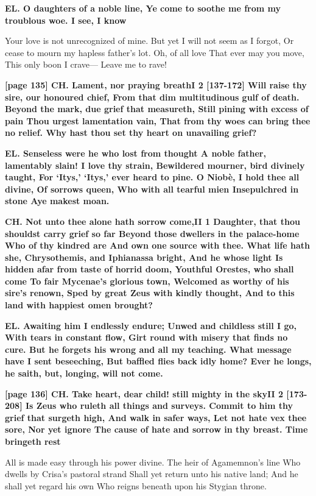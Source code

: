 \documentclass[11pt,letter]{book}
\begin{document}
\par \textbf{EL. O daughters of a noble line, Ye come to soothe me from my troublous woe. I see, I know}
\par   Your love is not unrecognized of mine. But yet I will not seem as I forgot, Or cease to mourn my hapless father’s lot. Oh, of all love That ever may you move, This only boon I crave— Leave me to rave!

\par \textbf{[page 135] CH. Lament, nor praying breathI 2 [137-172] Will raise thy sire, our honoured chief, From that dim multitudinous gulf of death. Beyond the mark, due grief that measureth, Still pining with excess of pain Thou urgest lamentation vain, That from thy woes can bring thee no relief. Why hast thou set thy heart on unavailing grief?}
\par 

\par \textbf{EL. Senseless were he who lost from thought A noble father, lamentably slain! I love thy strain, Bewildered mourner, bird divinely taught, For ‘Itys,’ ‘Itys,’ ever heard to pine. O Niobè, I hold thee all divine, Of sorrows queen, Who with all tearful mien Insepulchred in stone Aye makest moan.}
\par 

\par \textbf{CH. Not unto thee alone hath sorrow come,II 1 Daughter, that thou shouldst carry grief so far Beyond those dwellers in the palace-home Who of thy kindred are And own one source with thee. What life hath she, Chrysothemis, and Iphianassa bright, And he whose light Is hidden afar from taste of horrid doom, Youthful Orestes, who shall come To fair Mycenae’s glorious town, Welcomed as worthy of his sire’s renown, Sped by great Zeus with kindly thought, And to this land with happiest omen brought?}
\par 

\par \textbf{EL. Awaiting him I endlessly endure; Unwed and childless still I go, With tears in constant flow, Girt round with misery that finds no cure. But he forgets his wrong and all my teaching. What message have I sent beseeching, But baffled flies back idly home? Ever he longs, he saith, but, longing, will not come.}
\par 

\par \textbf{[page 136] CH. Take heart, dear child! still mighty in the skyII 2 [173-208] Is Zeus who ruleth all things and surveys. Commit to him thy grief that surgeth high, And walk in safer ways, Let not hate vex thee sore, Nor yet ignore The cause of hate and sorrow in thy breast. Time bringeth rest}
\par   All is made easy through his power divine. The heir of Agamemnon’s line Who dwells by Crisa’s pastoral strand Shall yet return unto his native land; And he shall yet regard his own Who reigns beneath upon his Stygian throne.
\end{document}

